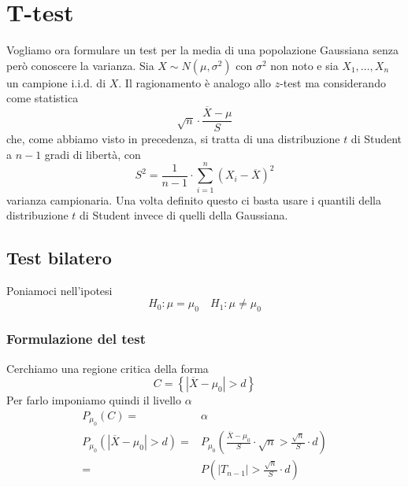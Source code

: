 \section{T-test}
Vogliamo ora formulare un test per la media di una popolazione Gaussiana senza però conoscere la
varianza. Sia $X \sim N(\mu, \sigma^2)$ con $\sigma^2$ non noto e sia $X_1, \dots, X_n$ un campione
i.i.d. di $X$. Il ragionamento è analogo allo $z$-test ma considerando come statistica
\[ \sqrt{n} \cdot \frac{\overline{X} - \mu}{S} \]
che, come abbiamo visto in precedenza, si tratta di una distribuzione $t$ di Student a $n-1$ gradi
di libertà, con
\[ S^2 = \frac{1}{n-1} \cdot \sum_{i=1}^n \left( X_i - \overline{X} \right)^2 \]
varianza campionaria. Una volta definito questo ci basta usare i quantili della distribuzione $t$
di Student invece di quelli della Gaussiana.

\subsection{Test bilatero}
Poniamoci nell'ipotesi
\[ H_0: \mu = \mu_0 \quad H_1: \mu \neq \mu_0 \]

\subsubsection{Formulazione del test}
Cerchiamo una regione critica della forma
\[ C = \left\{ |\overline{X} - \mu_0| > d \right\} \]
Per farlo imponiamo quindi il livello $\alpha$
\begin{align*}
	P_{\mu_0} (C) =                          & \alpha \\
	P_{\mu_0} (|\overline{X} - \mu_0| > d) = &
	P_{\mu_0} \left( \frac{\overline{X} - \mu_0}{S} \cdot \sqrt{n} >
	\frac{\sqrt{n}}{S} \cdot d \right)                \\
	=                                        &
	P \left( |T_{n-1}| > \frac{\sqrt{n}}{S} \cdot d \right)
\end{align*}